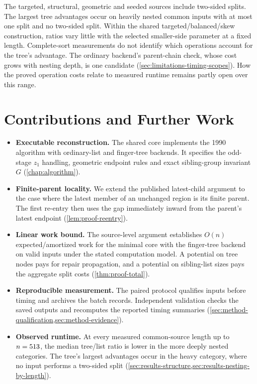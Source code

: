 The targeted, structural, geometric and seeded sources include two-sided
splits. The largest tree advantages occur on heavily nested common inputs
with at most one split and no two-sided split. Within the shared
targeted/balanced/skew construction, ratios vary little with the selected
smaller-side parameter at a fixed length. Complete-sort measurements do not
identify which operations account for the tree's advantage.
The ordinary backend's parent-chain check, whose cost grows with nesting
depth, is one candidate (\cref{sec:limitations-timing-scopes}). How the proved
operation costs relate to measured runtime remains partly open over this
range.

\section{Contributions and Further Work}
\label{sec:conclusion-contributions}
\label{sec:conclusion-future-work}
\label{sec:conclusion-closing}

\begin{itemize}[itemsep=.4\baselineskip]
  \item \textbf{Executable reconstruction.} The shared core implements the
  1990 algorithm with ordinary-list and finger-tree backends. It specifies
  the odd-stage $z_1$ handling, geometric endpoint rules and exact sibling-group
  invariant $G$ (\cref{chap:algorithm}).

  \item \textbf{Finite-parent locality.} We extend the published latest-child
  argument to the case where the latest member of an unchanged region is its
  finite parent. The first re-entry then uses the gap immediately inward from
  the parent's latest endpoint (\cref{lem:proof-reentry}).

  \item \textbf{Linear work bound.} The source-level argument establishes
  $O(n)$ expected/amortized work for the minimal core with the finger-tree
  backend on valid inputs under the stated computation model. A potential on
  tree nodes pays for repair propagation, and a potential on sibling-list
  sizes pays the aggregate split costs (\cref{thm:proof-total}).

  \item \textbf{Reproducible measurement.} The paired protocol qualifies
  inputs before timing and archives the batch records. Independent validation
  checks the saved outputs and recomputes the reported timing summaries
  (\cref{sec:method-qualification,sec:method-evidence}).

  \item \textbf{Observed runtime.} At every measured common-source length up
  to $n=513{}$, the median tree/list ratio is lower in the more deeply
  nested categories. The tree's largest advantages occur in the heavy category,
  where no input performs a two-sided split
  (\cref{sec:results-structure,sec:results-nesting-by-length}).
\end{itemize}


